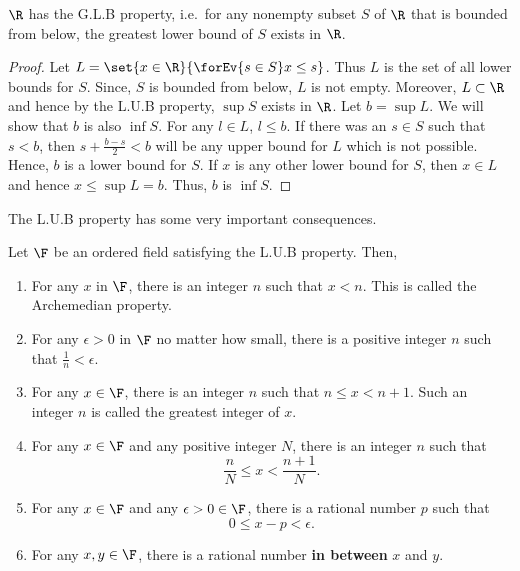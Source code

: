 \begin{Corollary}
    $\R$ has the G.L.B property, i.e.~for any nonempty subset $S$ of $\R$ that is bounded from below, the
    greatest lower bound of $S$ exists in $\R$.	
\end{Corollary}

\begin{proof}
    Let $L = \set{x \in \R}{\forEv{s\in S} x \leq s}$. Thus $L$ is the set of all lower bounds for $S$. Since,
    $S$ is bounded from below, $L$ is not empty. Moreover, $L \subset \R$ and hence by the L.U.B property,
    $\sup{S}$ exists in $\R$. Let $b = \sup{L}$. We will show that $b$ is also $\inf{S}$. For any $l \in L$,
    $l \leq b$. If there was an $s \in S$ such that $s < b$, then $s+\frac{b-s}{2} < b$ will be any upper
    bound for $L$ which is not possible. Hence, $b$ is a lower bound for $S$. If $x$ is any other lower bound
    for $S$, then $x \in L$ and hence $x \leq \sup{L} = b$. Thus, $b$ is $\inf{S}$. 
\end{proof}
The L.U.B property has some very important consequences.
\begin{Proposition}
    Let $\F$ be an ordered field satisfying the L.U.B property. Then,
    \begin{enumerate}
	\item
	    For any $x$ in $\F$, there is an integer $n$ such that $x < n$. This is called the Archemedian
	    property.
	\item
	    For any $\epsilon > 0$ in $\F$ no matter how small, there is a positive integer $n$ such 
	    that $\frac{1}{n} < \epsilon$.
	\item
	    For any $x\in \F$, there is an integer $n$ such that $n\leq x < n+1$. Such an integer $n$ is
	    called the greatest integer of $x$.
	\item
	    For any $x \in \F$ and any positive integer $N$, there is an integer $n$ such that 
	    \[\frac{n}{N} \leq x < \frac{n+1}{N}.\]
	\item
	    For any $x \in \F$ and any $\epsilon > 0 \in \F$, there is a rational number $p$ such that
	    \[0 \leq x - p < \epsilon.\]
	\item
	    For any $x,y \in \F$, there is a rational number \textbf{in between} $x$ and $y$.
    \end{enumerate}
\end{Proposition}
